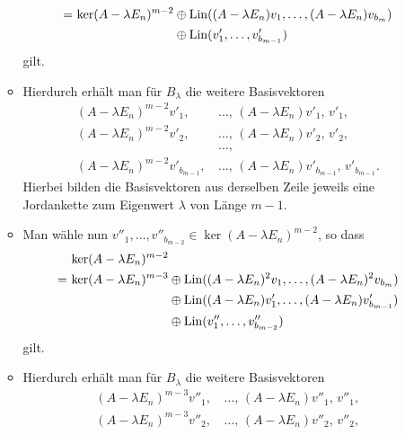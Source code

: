 \documentclass[a4paper,10pt,numbers = noenddot]{scrartcl}
\begin{document}
\begin{itemize}[resume]
\begin{itemize}
\begin{align*}
          =&\,          \ker (A - \lambda E_n)^{m-2}
                \oplus  \Lin( (A - \lambda E_n) v_1, \dotsc, (A - \lambda E_n) v_{b_m} )  \\
           &\,          \phantom{\ker (A - \lambda E_n)^{m-2}\,}
                \oplus  \Lin( v'_1, \dotsc, v'_{b_{m-1}}  )
        \end{align*}
        gilt.
      \item
        Hierdurch erhält man für $B_\lambda$ die weitere Basisvektoren
        \begin{align*}
          (A - \lambda E_n)^{m-2} v'_1,\,     &\dotsc,\,  (A - \lambda E_n) v'_1,\,             v'_1,     \\
          (A - \lambda E_n)^{m-2} v'_2,\,     &\dotsc,\,  (A - \lambda E_n) v'_2,\,             v'_2,     \\
                                              &\dotsc,                                                    \\
          (A - \lambda E_n)^{m-2} v'_{b_{m-1}},\, &\dotsc,\,  (A - \lambda E_n) v'_{b_{m-1}},\, v'_{b_{m-1}}.
        \end{align*}
        Hierbei bilden die Basisvektoren aus derselben Zeile jeweils eine Jordankette zum Eigenwert $\lambda$ von Länge $m-1$.
      \item
        Man wähle nun $v''_1, \dotsc, v''_{b_{m-2}} \in \ker (A - \lambda E_n)^{m-2}$, so dass
        \begin{align*}
           &\,          \ker (A - \lambda E_n)^{m-2}  \\
          =&\,          \ker (A - \lambda E_n)^{m-3}
                \oplus  \Lin( (A - \lambda E_n)^2 v_1, \dotsc, (A - \lambda E_n)^2 v_{b_m} )  \\
           &\,          \phantom{\ker (A - \lambda E_n)^{m-2}\,}
                \oplus  \Lin( (A - \lambda E_n) v'_1, \dotsc, (A - \lambda E_n) v'_{b_{m-1}}  ) \\
           &\,          \phantom{\ker (A - \lambda E_n)^{m-2}\,}
                \oplus  \Lin( v''_1, \dotsc, v''_{b_{m-2}}  )
        \end{align*}
        gilt.
      \item
        Hierdurch erhält man für $B_\lambda$ die weitere Basisvektoren
        \begin{align*}
          (A - \lambda E_n)^{m-3} v''_1,\,          &\dotsc,\,  (A - \lambda E_n) v''_1,\,          v''_1,      \\
          (A - \lambda E_n)^{m-3} v''_2,\,          &\dotsc,\,  (A - \lambda E_n) v''_2,\,          v''_2,      \\

\end{align*}
\end{itemize}
\end{itemize}
\end{document}
